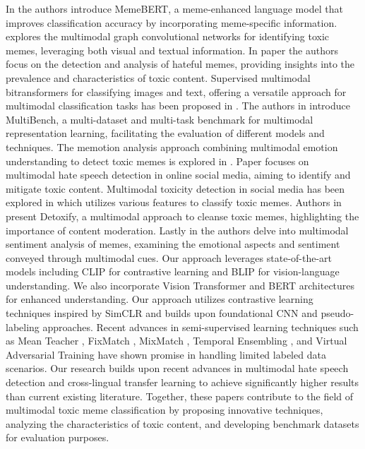 \documentclass{ieeeaccess}
\begin{document}
In \cite{b1} the authors introduce MemeBERT, a meme-enhanced language model that improves classification accuracy by incorporating meme-specific information. \cite{b2} explores the multimodal graph convolutional networks for identifying toxic memes, leveraging both visual and textual information. In paper \cite{b3} the authors focus on the detection and analysis of hateful memes, providing insights into the prevalence and characteristics of toxic content. Supervised multimodal bitransformers for classifying images and text, offering a versatile approach for multimodal classification tasks has been proposed in \cite{b4}. The authors in \cite{b5} introduce MultiBench, a multi-dataset and multi-task benchmark for multimodal representation learning, facilitating the evaluation of different models and techniques. The memotion analysis approach combining multimodal emotion understanding to detect toxic memes is explored in \cite{b6}. Paper \cite{b7} focuses on multimodal hate speech detection in online social media, aiming to identify and mitigate toxic content. Multimodal toxicity detection in social media has been explored in \cite{b8} which utilizes various features to classify toxic memes. Authors in \cite{b9} present Detoxify, a multimodal approach to cleanse toxic memes, highlighting the importance of content moderation. Lastly in \cite{b10} the authors delve into multimodal sentiment analysis of memes, examining the emotional aspects and sentiment conveyed through multimodal cues. Our approach leverages state-of-the-art models including CLIP \cite{b11} for contrastive learning and BLIP \cite{b12} for vision-language understanding. We also incorporate Vision Transformer \cite{b13} and BERT \cite{b14} architectures for enhanced understanding. Our approach utilizes contrastive learning techniques inspired by SimCLR \cite{b15} and builds upon foundational CNN \cite{b16,b17} and pseudo-labeling \cite{b18} approaches. Recent advances in semi-supervised learning techniques such as Mean Teacher \cite{b19}, FixMatch \cite{b20}, MixMatch \cite{b21}, Temporal Ensembling \cite{b22}, and Virtual Adversarial Training \cite{b23} have shown promise in handling limited labeled data scenarios. Our research builds upon recent advances in multimodal hate speech detection \cite{b24} and cross-lingual transfer learning \cite{b25} to achieve significantly higher results than current existing literature. Together, these papers contribute to the field of multimodal toxic meme classification by proposing innovative techniques, analyzing the characteristics of toxic content, and developing benchmark datasets for evaluation purposes.
\end{document}
